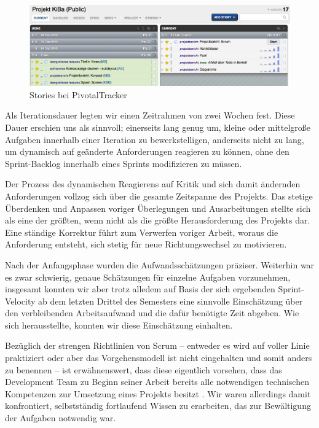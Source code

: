 \begin{figure}[h]
	\centering
	\includegraphics[scale=.25]{Pictures/pivottracker-overview}
	\caption{Stories bei PivotalTracker\label{fig:Pivottracker}}
\end{figure}

	Als Iterationsdauer legten wir einen Zeitrahmen von zwei Wochen fest. Diese Dauer erschien uns als sinnvoll; einerseits lang genug um, kleine oder mittelgroße Aufgaben innerhalb einer Iteration zu bewerkstelligen, anderseits nicht zu lang, um dynamisch auf geänderte Anforderungen reagieren zu können, ohne den Sprint-Backlog innerhalb eines Sprints modifizieren zu müssen. 
	
	Der Prozess des dynamischen Reagierens auf Kritik und sich damit ändernden Anforderungen vollzog sich über die gesamte Zeitspanne des Projekts. Das stetige Überdenken und Anpassen voriger Überlegungen und Ausarbeitungen stellte sich als eine der größten, wenn nicht als die größte Herausforderung des Projekts dar. Eine ständige Korrektur führt zum Verwerfen voriger Arbeit, woraus die Anforderung entsteht, sich stetig für neue Richtungswechsel zu motivieren.  

	Nach der Anfangsphase wurden die Aufwandsschätzungen präziser. Weiterhin war es zwar schwierig, genaue Schätzungen für einzelne Aufgaben vorzunehmen, insgesamt konnten wir aber trotz alledem auf Basis der sich ergebenden Sprint-Velocity ab dem letzten Drittel des Semesters eine sinnvolle Einschätzung über den verbleibenden Arbeitsaufwand und die dafür benötigte Zeit abgeben. Wie sich herausstellte, konnten wir diese Einschätzung einhalten. 

	Bezüglich der strengen Richtlinien von Scrum – entweder es wird auf voller Linie praktiziert oder aber das Vorgehensmodell ist nicht eingehalten und somit anders zu benennen – ist erwähnenswert, dass diese eigentlich vorsehen, dass das Development Team zu Beginn seiner Arbeit bereits alle notwendigen technischen Kompetenzen zur Umsetzung eines Projekts besitzt \citep{ScrumGuideFull14}. Wir waren allerdings damit konfrontiert, selbstständig fortlaufend Wissen zu erarbeiten, das zur Bewältigung der Aufgaben notwendig war.

